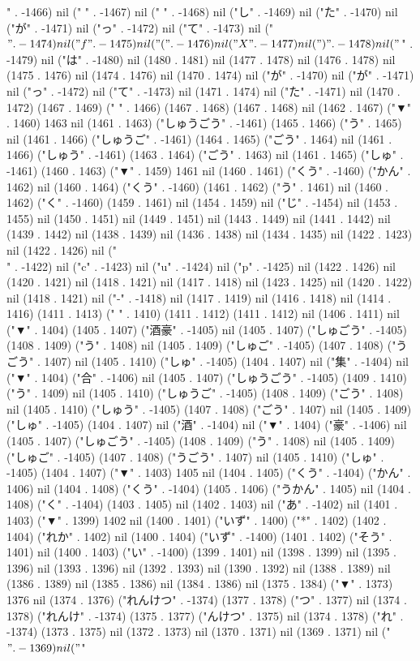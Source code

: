{" . -1466) nil (" " . -1467) nil (" " . -1468) nil ("し" . -1469) nil ("た" . -1470) nil ("が" . -1471) nil ("っ" . -1472) nil ("て" . -1473) nil ("$" . -1474) nil ("f" . -1475) nil ("(" . -1476) nil ("X" . -1477) nil (")" . -1478) nil ("$" . -1479) nil ("は" . -1480) nil (1480 . 1481) nil (1477 . 1478) nil (1476 . 1478) nil (1475 . 1476) nil (1474 . 1476) nil (1470 . 1474) nil ("が" . -1470) nil ("が" . -1471) nil ("っ" . -1472) nil ("て" . -1473) nil (1471 . 1474) nil ("た" . -1471) nil (1470 . 1472) (1467 . 1469) (" " . 1466) (1467 . 1468) (1467 . 1468) nil (1462 . 1467) ("▼" . 1460) 1463 nil (1461 . 1463) ("しゅうごう" . -1461) (1465 . 1466) ("う" . 1465) nil (1461 . 1466) ("しゅうご" . -1461) (1464 . 1465) ("ごう" . 1464) nil (1461 . 1466) ("しゅう" . -1461) (1463 . 1464) ("ごう" . 1463) nil (1461 . 1465) ("しゅ" . -1461) (1460 . 1463) ("▼" . 1459) 1461 nil (1460 . 1461) ("くう" . -1460) ("かん" . 1462) nil (1460 . 1464) ("くう" . -1460) (1461 . 1462) ("う" . 1461) nil (1460 . 1462) ("く" . -1460) (1459 . 1461) nil (1454 . 1459) nil ("じ" . -1454) nil (1453 . 1455) nil (1450 . 1451) nil (1449 . 1451) nil (1443 . 1449) nil (1441 . 1442) nil (1439 . 1442) nil (1438 . 1439) nil (1436 . 1438) nil (1434 . 1435) nil (1422 . 1423) nil (1422 . 1426) nil ("\\" . -1422) nil ("c" . -1423) nil ("u" . -1424) nil ("p" . -1425) nil (1422 . 1426) nil (1420 . 1421) nil (1418 . 1421) nil (1417 . 1418) nil (1423 . 1425) nil (1420 . 1422) nil (1418 . 1421) nil ("-" . -1418) nil (1417 . 1419) nil (1416 . 1418) nil (1414 . 1416) (1411 . 1413) (" " . 1410) (1411 . 1412) (1411 . 1412) nil (1406 . 1411) nil ("▼" . 1404) (1405 . 1407) ("酒豪" . -1405) nil (1405 . 1407) ("しゅごう" . -1405) (1408 . 1409) ("う" . 1408) nil (1405 . 1409) ("しゅご" . -1405) (1407 . 1408) ("うごう" . 1407) nil (1405 . 1410) ("しゅ" . -1405) (1404 . 1407) nil ("集" . -1404) nil ("▼" . 1404) ("合" . -1406) nil (1405 . 1407) ("しゅうごう" . -1405) (1409 . 1410) ("う" . 1409) nil (1405 . 1410) ("しゅうご" . -1405) (1408 . 1409) ("ごう" . 1408) nil (1405 . 1410) ("しゅう" . -1405) (1407 . 1408) ("ごう" . 1407) nil (1405 . 1409) ("しゅ" . -1405) (1404 . 1407) nil ("酒" . -1404) nil ("▼" . 1404) ("豪" . -1406) nil (1405 . 1407) ("しゅごう" . -1405) (1408 . 1409) ("う" . 1408) nil (1405 . 1409) ("しゅご" . -1405) (1407 . 1408) ("うごう" . 1407) nil (1405 . 1410) ("しゅ" . -1405) (1404 . 1407) ("▼" . 1403) 1405 nil (1404 . 1405) ("くう" . -1404) ("かん" . 1406) nil (1404 . 1408) ("くう" . -1404) (1405 . 1406) ("うかん" . 1405) nil (1404 . 1408) ("く" . -1404) (1403 . 1405) nil (1402 . 1403) nil ("あ" . -1402) nil (1401 . 1403) ("▼" . 1399) 1402 nil (1400 . 1401) ("いず" . 1400) ("*" . 1402) (1402 . 1404) ("れか" . 1402) nil (1400 . 1404) ("いず" . -1400) (1401 . 1402) ("そう" . 1401) nil (1400 . 1403) ("い" . -1400) (1399 . 1401) nil (1398 . 1399) nil (1395 . 1396) nil (1393 . 1396) nil (1392 . 1393) nil (1390 . 1392) nil (1388 . 1389) nil (1386 . 1389) nil (1385 . 1386) nil (1384 . 1386) nil (1375 . 1384) ("▼" . 1373) 1376 nil (1374 . 1376) ("れんけつ" . -1374) (1377 . 1378) ("つ" . 1377) nil (1374 . 1378) ("れんけ" . -1374) (1375 . 1377) ("んけつ" . 1375) nil (1374 . 1378) ("れ" . -1374) (1373 . 1375) nil (1372 . 1373) nil (1370 . 1371) nil (1369 . 1371) nil ("$" . -1369) nil ("$" }
